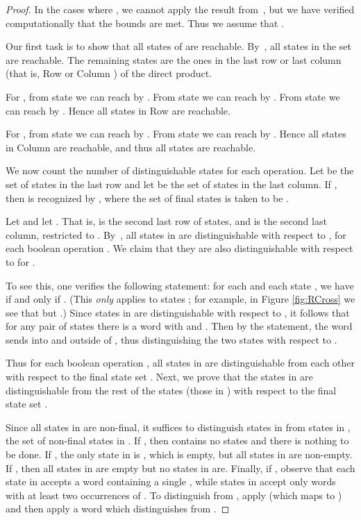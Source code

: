 \documentclass[final]{dmtcs-episciences}
\theoremstyle{definition}
\theoremstyle{remark}
\begin{document}
\begin{proof}
In the cases where , we cannot 
apply the result from~\cite[Theorem 1]{BBMR14}, but we have verified computationally that the bounds are met. Thus we assume that .

Our first task is to show that all  states of  are reachable.
By~\cite[Theorem 1]{BBMR14}, all states in the set  are reachable. The remaining states are the ones in the last row or last column (that is, Row  or Column ) of the direct product.

For , from state  we can reach  by . From state  we can reach  by . From state  we can reach  by . Hence all states in Row  are reachable.

For , from state  we can reach  by . From state  we can reach  by . Hence all states in Column  are reachable, and thus all  states are reachable.

We now count the number of distinguishable states for each operation. Let  be the set of states in the last row and let  be the set of states in the last column. If , then  is recognized by , where the set of final states is taken to be .

Let  and let .
That is,  is the second last row of states, and  is the second last column, restricted to . 
By~\cite[Theorem 1]{BBMR14}, all states in  are distinguishable with respect to , for each boolean operation .
We claim that they are also distinguishable with respect to  for .

To see this, one verifies the following statement: for each  and each state , we have  if and only if . (This \emph{only} applies to states ; for example, in Figure \ref{fig:RCross} we see that  but .) Since states in  are distinguishable with respect to , it follows that for any pair of states  there is a word  with  and . Then by the statement, the word  sends  into  and  outside of , thus distinguishing the two states with respect to .


Thus for each boolean operation , all 
states in  are distinguishable from each other with respect to the final state set . Next, we prove that the states in  are distinguishable from the rest of the states (those in ) with respect to the final state set .

Since all states in  are non-final, it suffices to distinguish states in  from states in , the set of non-final states in . If , then  contains no states and there is nothing to be done. 
If , the only state in  is , which is empty, but all states in  are non-empty. If , then all states in  are empty but no states in  are.
Finally, if , observe that each state in  accepts a word containing a single , while states in   accept only words with at least two occurrences of . To distinguish  from , apply  (which maps  to ) and then apply a word which distinguishes  from .


\end{proof}
\end{document}
